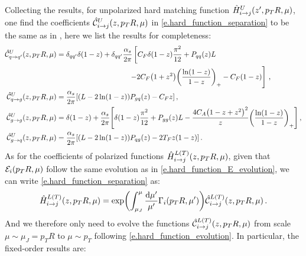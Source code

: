 \documentclass[a4paper, 11 pt]{article}
\begin{document}
Collecting the results,  for unpolarized hard matching function $\hat{H}_{i \to j}^U \pqty{z', p_TR , \mu}$, one find the coefficients $\hat{\mathcal{C}}^{U}_{i \rightarrow j} \pqty{z, p_TR, \mu}$ in \cref{e.hard_function_separation} to be the same as in \cite{Kang:2017glf}, here we list the results for completeness:
\begin{align}
\hat{\mathcal{C}}^U_{q \rightarrow q^{\prime}} \pqty{z, p_TR, \mu}
& =
\delta_{q q'} \delta(1-z)
+
\delta_{q q'} \frac{\alpha_s}{2 \pi} \left[C_F \delta(1-z) \frac{\pi^2}{12}+P_{q q}(z) L \right.
\nonumber \\
& \qquad \qquad \qquad \qquad \qquad
\left. -2 C_F \pqty{1+z^2} \pqty{\frac{\ln (1-z)}{1-z}}_+ - C_F(1-z) \right]
\, , \\
\hat{\mathcal{C}}^U_{q \rightarrow g} \pqty{z, p_TR, \mu}
& =
\frac{\alpha_s}{2 \pi} \bqty{(L-2 \ln(1-z)) P_{g q}(z)-C_F z}
\, , \\
\hat{\mathcal{C}}^U_{g \rightarrow g} \pqty{z, p_TR, \mu}
& =
\delta(1-z)
+
\frac{\alpha_s}{2 \pi} \bqty{\delta(1-z) \frac{\pi^2}{12} + P_{g g}(z) L - \frac{4 C_A \pqty{1-z+z^2}^2}{z} \pqty{\frac{\ln (1-z)}{1-z}}_+}
\, , \\
\hat{\mathcal{C}}^U_{g \rightarrow q} \pqty{z, p_TR, \mu}
& =
\frac{\alpha_s}{2 \pi} \bqty{(L-2 \ln(1-z)) P_{q g}(z) - 2 T_F z (1-z)}
\, .
\end{align}
As for the coefficients of polarized functions $\hat{H}^{L(T)}_{i \rightarrow j} \pqty{z, p_TR, \mu}$, given that $\mathcal{E}_i \pqty{p_TR, \mu}$ follow the same evolution as in \cref{e.hard_function_E_evolution}, we can write \cref{e.hard_function_separation} as:
\begin{equation} \label{e.hard_function_evolution_final}
\hat{H}^{L(T)}_{i \rightarrow j} \pqty{z, p_TR, \mu}
=
\exp(\int _{\mu _J}^{\mu} \frac{\dd{\mu'}}{\mu'} 
\Gamma _i \pqty{p_TR, \mu'})
\hat{\mathcal{C}}^{L(T)}_{i \rightarrow j} \pqty{z, p_TR, \mu}
\, .
\end{equation}
And we therefore only need to evolve the functions $\hat{\mathcal{C}}^{L(T)}_{i \rightarrow j} \pqty{z, p_TR, \mu}$ from scale $\mu \sim \mu _J = p_T R$ to $\mu \sim p_T$ following \cref{e.hard_function_evolution}.
In particular, the fixed-order results are:
\end{document}
